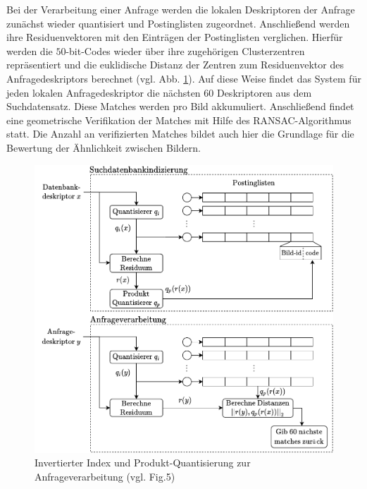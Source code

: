 Bei der Verarbeitung einer Anfrage werden die lokalen Deskriptoren der Anfrage zunächst wieder quantisiert und Postinglisten zugeordnet. Anschließend werden ihre Residuenvektoren mit den Einträgen der Postinglisten verglichen. Hierfür werden die $50$-bit-Codes wieder über ihre zugehörigen Clusterzentren repräsentiert und die euklidische Distanz der Zentren zum Residuenvektor des Anfragedeskriptors berechnet (vgl. Abb. \ref{inv_ind}). Auf diese Weise findet das System für jeden lokalen Anfragedeskriptor die nächsten $60$ Deskriptoren aus dem Suchdatensatz. Diese Matches werden pro Bild akkumuliert. Anschließend findet eine geometrische Verifikation der Matches mit Hilfe des RANSAC-Algorithmus statt. Die Anzahl an verifizierten Matches bildet auch hier die Grundlage für die Bewertung der Ähnlichkeit zwischen Bildern.
\begin{figure}[h]
\centering
\includegraphics[scale=0.87]{inv_ind.pdf}
\caption{Invertierter Index und Produkt-Quantisierung zur Anfrageverarbeitung (vgl. \cite{pq} Fig.5)}
\label{inv_ind}
\end{figure}